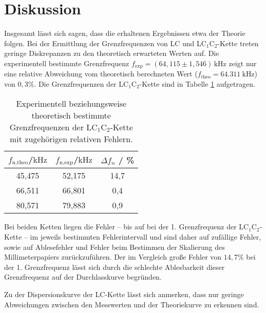 \section{Diskussion}
\label{sec:Diskussion}
Insgesamt lässt sich sagen, dass die erhaltenen Ergebnissen etwa der Theorie folgen.
\FloatBarrier
Bei der Ermittlung der Grenzfrequenzen von LC und LC$_1$C$_2$-Kette treten geringe
Diskrepanzen zu den theoretisch erwarteten Werten auf.
Die experimentell bestimmte Grenzfrequenz $f_{\text{exp}}=(64,115 \pm 1,546) \, \si{\kilo\hertz}$
zeigt nur eine relative Abweichung vom theoretisch berechneten Wert ($f_{\text{theo}}=\SI{64,311}{\kilo\hertz}$) von $0,3\%$.
Die Grenzfrequenzen der LC$_1$C$_2$-Kette sind in Tabelle \ref{tab:halleluja} aufgetragen.
\begin{table}
	\caption{Experimentell beziehungsweise theoretisch bestimmte Grenzfrequenzen der LC$_1$C$_2$-Kette mit zugehörigen relativen Fehlern.}
	\label{tab:halleluja}
	\centering
	\begin{tabular}{ccc}
		\toprule
		$f_{\text{n,theo}}$/$\si{\kilo\hertz}$ & $f_{\text{n,exp}}$/$\si{\kilo\hertz}$ & $\Delta f_n$ / \% \\
		\midrule
		45,475                                 & 52,175                                & 14,7              \\
		66,511                                 & 66,801                                & 0,4               \\
		80,571                                 & 79,883                                & 0,9               \\
		\bottomrule
	\end{tabular}
\end{table}

Bei beiden Ketten liegen die Fehler -- bis auf bei der 1. Grenzfrequenz der LC$_1$C$_2$-Kette --
im jeweils bestimmten Fehlerintervall und sind daher auf
zufällige Fehler, sowie auf Ablesefehler und Fehler beim Bestimmen der Skalierung des
Millimeterpapiers zurückzuführen.
Der im Vergleich große Fehler von $14,7 \%$ bei der 1. Grenzfrequenz lässt sich durch die
schlechte Ablesbarkeit dieser Grenzfrequenz auf der Durchlasskurve begründen.
\FloatBarrier

Zu der Dispersionskurve der LC-Kette lässt sich anmerken, dass nur geringe Abweichungen zwischen
den Messwerten und der Theoriekurve zu erkennen sind.

